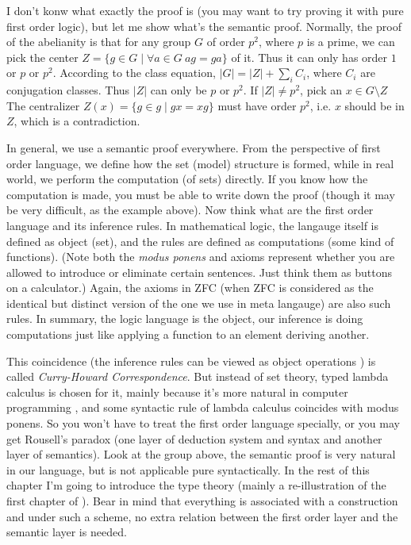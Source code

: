 I don't konw what exactly the proof is (you may want to try proving it 
with pure first order logic), but let me show what's the semantic proof. 
Normally, the proof of the abelianity is that for any group $G$ of order 
$p^2$, where $p$ is a prime, we can pick the center 
$Z =  \{g\in G\mid\forall a\in G\ ag=ga\}$ of it. Thus it can only has 
order $1$ or $p$ or $p^2$. According to the class equation, 
$|G| = |Z| + \sum_iC_i$, where $C_i$ are conjugation classes. Thus $|Z|$
can only be $p$ or $p^2$. If $|Z|\neq p^2$, pick an $x\in G\setminus Z$
The centralizer $Z(x) = \{g\in g\mid gx=xg\}$ must have order $p^2$, i.e.
$x$ should be in $Z$, which is a contradiction.

In general, we use a semantic proof everywhere. From the perspective of
first order language, we define how the set (model) structure is formed,
while in real world, we perform the computation (of sets) directly. If
you know how the computation is made, you must be able to write down the
proof (though it may be very difficult, as the example above). Now think
what are the first order language and its inference rules. In mathematical 
logic, the langauge itself is defined as object (set), and the rules are
defined as computations (some kind of functions). (Note both the 
{\it modus ponens} and axioms represent whether you are allowed to 
introduce or eliminate certain sentences. Just think them as buttons on
a calculator.) Again, the axioms in ZFC (when ZFC is considered as the
identical but distinct version of the one we use in meta langauge) are 
also such rules. In summary, the logic language is the object, our
inference is doing computations just like applying a function to an
element deriving another. 

This coincidence (the inference rules can be viewed as 
object operations ) is called {\it Curry-Howard 
Correspondence}. But instead of set theory, typed lambda calculus
\cite{Curry-Howard} is chosen for it, mainly because it's more natural 
in computer programming \cite{coq,SF}, and some syntactic rule of lambda 
calculus coincides with modus ponens. So you won't have to treat the 
first order language specially, or you may get Rousell's paradox
(one layer of deduction system and syntax and another layer of semantics). 
Look at the group above, the semantic proof is very natural in our 
language, but is not applicable pure syntactically. In the rest of this 
chapter I'm going to introduce the type theory (mainly a re-illustration 
of the first chapter of \cite{homotopy-type-theory}). Bear in mind that 
everything is associated with a construction and under such a scheme, 
no extra relation between the first order layer and the semantic layer
is needed. 

